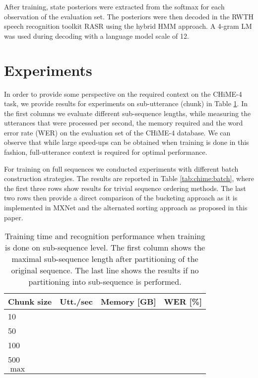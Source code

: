 \documentclass{article}
\begin{document}
  After training, state posteriors were extracted from the softmax for each observation of the evaluation set. The posteriors were then decoded in the RWTH 
  speech recognition toolkit RASR \cite{rybach2011:rasr} using the hybrid HMM approach. A 4-gram LM 
  was used during decoding with a language model scale of 12.

  \section{Experiments} \label{sec:experiments}
   In order to provide some perspective on the required context on the CHiME-4 task, 
   we provide results for experiments on sub-utterance (chunk) in 
   Table \ref{tab:chime:chunk}. In the first columns we evaluate different sub-sequence lengths, while measuring the utterances that were processed per second, the memory required and the word error rate (WER) on the evaluation set of the CHiME-4 database. We can observe that 
   while large speed-ups can be obtained when training is done in this fashion, full-utterance context is
   required for optimal performance.
   
   For training on full sequences we conducted experiments with different batch construction strategies.
   The results are reported in Table \ref{tab:chime:batch}, where the first three rows show results for trivial sequence ordering 
   methods. The last two rows then provide a direct comparison of the bucketing approach as 
   it is implemented in MXNet and the alternated sorting approach as proposed in this paper.
    
	\begin{table}[tbp]
		\centering
		\caption{Training time and recognition performance when training is done 
		on sub-sequence level. The first column shows the maximal sub-sequence length 
		after partitioning of the original sequence. The last line shows the results 
		if no partitioning into sub-sequence is performed. }
		\label{tab:chime:chunk}
		\begin{tabular}{lrrr}
			\hline
			Chunk size              & Utt./sec & Memory [GB] & WER [\%] \\
			\hline
			10     					&				 &			   &			 \\
			50  					&				 &			   &    		 \\
			100 					& 				 &			   &			 \\
			500						& 				 &			   &			 \\
			$\max$					&				 &			   &			 \\
			\hline
		\end{tabular}
	\end{table}
\end{document}
